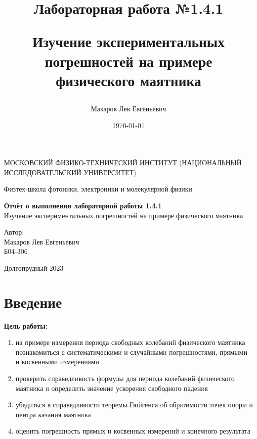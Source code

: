 \documentclass[a4paper,12pt]{article}
\author{Макаров Лев Евгеньевич}
\title{Лабораторная работа №1.4.1

Изучение экспериментальных погрешностей на примере физического маятника
}
\date{\today}
\begin{document}
\begin{titlepage}
	\begin{center}
		{\large МОСКОВСКИЙ ФИЗИКО-ТЕХНИЧЕСКИЙ ИНСТИТУТ (НАЦИОНАЛЬНЫЙ ИССЛЕДОВАТЕЛЬСКИЙ УНИВЕРСИТЕТ)}
	\end{center}
	\begin{center}
		{\large Физтех-школа фотоники, электроники и молекулярной физики}
	\end{center}
	
	
	\vspace{4.5cm}
	{\huge
		\begin{center}
			{\bf Отчёт о выполнении лабораторной работы 1.4.1}\\
			Изучение экспериментальных погрешностей на примере физического маятника
		\end{center}
	}
	\vspace{2cm}
	\begin{flushright}
		{\LARGE Автор:\\ Макаров Лев Евгеньевич \\
			\vspace{0.2cm}
			Б04-306}
	\end{flushright}
	\vspace{8cm}
	\begin{center}
		Долгопрудный 2023
	\end{center}
\end{titlepage}

\section{Введение}

\textbf{Цель работы:} 
\begin{enumerate}
	\item на примере измерения периода свободных колебаний физического маятника познакомиться с систематическими и случайными погрешностями, прямыми и косвенными измерениями
	\item проверить справедливость формулы для периода колебаний физического маятника и определить значение ускорения свободного падения
        \item убедиться в справедливости теоремы Гюйгенса об обратимости точек опоры и центра качания маятника
        \item оценить погрешность прямых и косвенных измерений и конечного результата
\end{enumerate}
\end{document}
